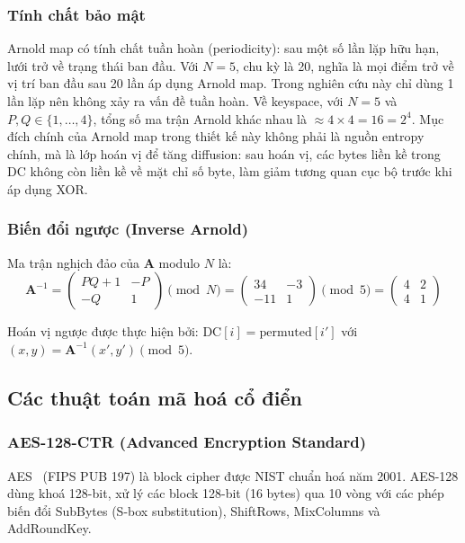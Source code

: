 \subsubsection{Tính chất bảo mật}

Arnold map có tính chất tuần hoàn (periodicity): sau một số lần lặp hữu hạn, lưới trở về trạng thái ban đầu. Với $N = 5$, chu kỳ là 20, nghĩa là mọi điểm trở về vị trí ban đầu sau 20 lần áp dụng Arnold map. Trong nghiên cứu này chỉ dùng 1 lần lặp nên không xảy ra vấn đề tuần hoàn. Về keyspace, với $N = 5$ và $P, Q \in \{1,\ldots,4\}$, tổng số ma trận Arnold khác nhau là $\approx 4 \times 4 = 16 = 2^4$. Mục đích chính của Arnold map trong thiết kế này không phải là nguồn entropy chính, mà là lớp hoán vị để tăng diffusion: sau hoán vị, các bytes liền kề trong DC không còn liền kề về mặt chỉ số byte, làm giảm tương quan cục bộ trước khi áp dụng XOR.

\subsubsection{Biến đổi ngược (Inverse Arnold)}

Ma trận nghịch đảo của $\mathbf{A}$ modulo $N$ là:
\begin{equation}
\mathbf{A}^{-1} = \begin{pmatrix} PQ+1 & -P \\ -Q & 1 \end{pmatrix} \pmod{N}
= \begin{pmatrix} 34 & -3 \\ -11 & 1 \end{pmatrix} \pmod{5}
= \begin{pmatrix} 4 & 2 \\ 4 & 1 \end{pmatrix}
\end{equation}

Hoán vị ngược được thực hiện bởi: $\text{DC}[i] = \text{permuted}[i']$ với $(x, y) = \mathbf{A}^{-1}(x', y') \pmod{5}$.

\subsection{Các thuật toán mã hoá cổ điển}

\subsubsection{AES-128-CTR (Advanced Encryption Standard)}

AES~\cite{fips_aes} (FIPS PUB 197) là block cipher được NIST chuẩn hoá năm 2001. AES-128 dùng khoá 128-bit, xử lý các block 128-bit (16 bytes) qua 10 vòng với các phép biến đổi SubBytes (S-box substitution), ShiftRows, MixColumns và AddRoundKey.

